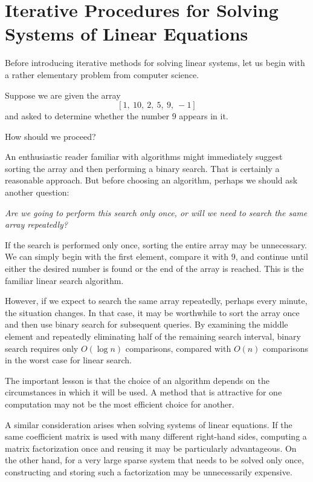 \documentclass[11pt,a4paper]{article}
\theoremstyle{definition}
\theoremstyle{remark}
\begin{document}
\section{Iterative Procedures for Solving Systems of Linear Equations}

Before introducing iterative methods for solving linear systems,
let us begin with a rather elementary problem from computer science.

Suppose we are given the array
\[
    [1,\ 10,\ 2,\ 5,\ 9,\ -1]
\]
and asked to determine whether the number $9$ appears in it.

How should we proceed?

An enthusiastic reader familiar with algorithms might immediately
suggest sorting the array and then performing a binary search.
That is certainly a reasonable approach. But before choosing an
algorithm, perhaps we should ask another question:

\emph{Are we going to perform this search only once, or will we
need to search the same array repeatedly?}

If the search is performed only once, sorting the entire array
may be unnecessary. We can simply begin with the first element,
compare it with $9$, and continue until either the desired
number is found or the end of the array is reached. This is
the familiar linear search algorithm.

However, if we expect to search the same array repeatedly,
perhaps every minute, the situation changes. In that case,
it may be worthwhile to sort the array once and then use
binary search for subsequent queries. By examining the
middle element and repeatedly eliminating half of the
remaining search interval, binary search requires only
$O(\log n)$ comparisons, compared with $O(n)$ comparisons
in the worst case for linear search.

The important lesson is that the choice of an algorithm
depends on the circumstances in which it will be used.
A method that is attractive for one computation may
not be the most efficient choice for another.

A similar consideration arises when solving systems of
linear equations. If the same coefficient matrix is used
with many different right-hand sides, computing a matrix
factorization once and reusing it may be particularly
advantageous. On the other hand, for a very large sparse
system that needs to be solved only once, constructing
and storing such a factorization may be unnecessarily
expensive.
\end{document}
